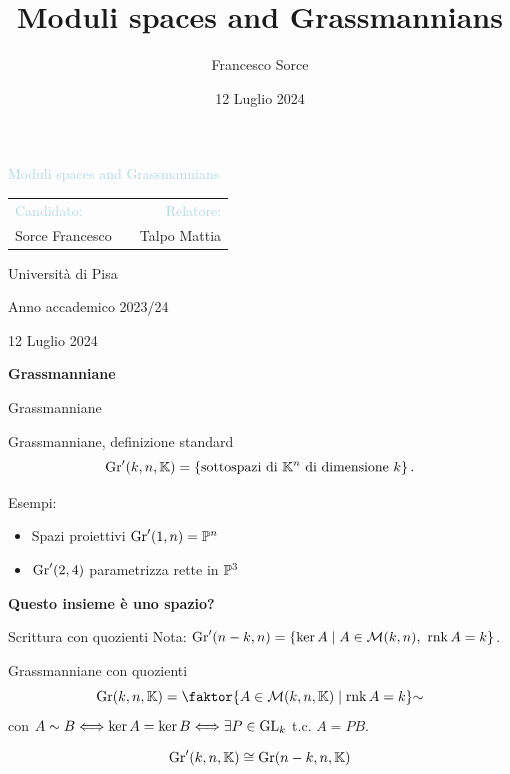 \documentclass[a4paper]{beamer}
\title{Moduli spaces and Grassmannians}
\author{Francesco Sorce}
\institute[]{Universit\`a di Pisa}
\date{12 Luglio 2024}
\begin{document}
\begin{frame}{}
\begin{center}
{\Large \textcolor{LightBlue}{Moduli spaces and Grassmannians}}
\vspace{1cm}

\begin{tabular}{lm{4.5cm}r}
\textcolor{LightBlue}{Candidato:} && \textcolor{LightBlue}{Relatore:}\\
Sorce Francesco && Talpo Mattia
\end{tabular}
\vspace{1cm}

{\footnotesize Universit\`a di Pisa

Anno accademico 2023/24}
\medskip
\vspace{0.5cm}

12 Luglio 2024
\end{center}
\end{frame}


\begin{frame}{}
\begin{center}
{\huge \textbf{Grassmanniane}}
\end{center}
\end{frame}

\begin{frame}{Grassmanniane}
\begin{block}{Grassmanniane, definizione standard}
\[\mathrm{Gr}'(k,n,\mathbb{K})=\left\{{\text{sottospazi di $\mathbb{K}^n$ di dimensione $k$}}\right\}.\]
\end{block}
\bigskip

\pause
Esempi:
\begin{itemize}
\item Spazi proiettivi $\mathrm{Gr}'(1,n)=\mathbb{P}^n$\pause
\item $\mathrm{Gr}'(2,4)$ parametrizza rette in $\mathbb{P}^3$
\end{itemize}
\end{frame}

\begin{frame}{}
\begin{center}
{\Large \textbf{Questo insieme \`e uno spazio?}}
\end{center}
\end{frame}

\begin{frame}{Scrittura con quozienti}
Nota: $\mathrm{Gr}'(n-k,n)=\left\{{\ker A\mid A\in \mathcal{M}(k,n),\ \mathrm{rnk}\, A=k}\right\}$.
\medskip

\begin{block}{Grassmanniane con quozienti}
\[\Gr(k,n,\K)=\quot{\cpa{A\in \Mc(k,n,\K)\mid \rnk A=k}}\sim\]
con $A\sim B\Longleftrightarrow \ker A=\ker B\Longleftrightarrow \exists P\in\mathrm{GL}_k$ t.c. $A=PB$.
\end{block}
\medskip
\[\mathrm{Gr}'(k,n,\mathbb{K})\cong\mathrm{Gr}(n-k,n,\mathbb{K})\]
\end{frame}
\end{document}
